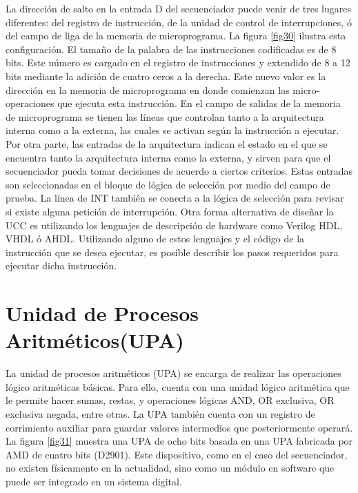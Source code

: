 \documentclass[12pt]{book}
\theoremstyle{definition}
\theoremstyle{remark}
\theoremstyle{plain}
\begin{document}
La dirección de salto en la entrada D del secuenciador puede
venir de tres lugares diferentes: del registro de instrucción, de la unidad de control de interrupciones,
ó del campo de liga de la memoria de microprograma. La figura \ref{fig30} ilustra esta configuración.
El tamaño de la palabra de las instrucciones codificadas es de 8 bits. Este número es cargado en
el registro de instrucciones y extendido de 8 a 12 bits mediante la adición de cuatro ceros a la derecha. Este nuevo valor es la dirección en la memoria de microprograma en donde comienzan las
micro-operaciones que ejecuta esta instrucción.
En el campo de salidas de la memoria de microprograma se tienen las líneas que controlan tanto a
la arquitectura interna como a la externa, las cuales se activan según la instrucción a ejecutar.
Por otra parte, las entradas de la arquitectura indican el estado en el que se encuentra tanto la
arquitectura interna como la externa, y sirven para que el secuenciador pueda tomar decisiones de
acuerdo a ciertos criterios. Estas entradas son seleccionadas en el bloque de lógica de selección por
medio del campo de prueba. La línea de INT también se conecta a la lógica de selección para revisar
si existe alguna petición de interrupción.
Otra forma alternativa de diseñar la UCC es utilizando los lenguajes de descripción de hardware
como Verilog HDL, VHDL ó AHDL. Utilizando alguno de estos lenguajes y el código de la
instrucción que se desea ejecutar, es posible describir los pasos requeridos para ejecutar dicha
instrucción.

\section{Unidad de Procesos Aritméticos(UPA)}


La unidad de procesos aritméticos (UPA) se encarga de realizar las operaciones lógico
aritméticas básicas. Para ello, cuenta con una unidad lógico aritmética que le permite hacer sumas,
restas, y operaciones lógicas AND, OR exclusiva, OR exclusiva negada, entre otras. La UPA
también cuenta con un registro de corrimiento auxiliar para guardar valores intermedios que
posteriormente operará.
La figura \ref{fig31} muestra una UPA de ocho bits basada en una UPA fabricada por AMD de cuatro
bits (D2901). Este dispositivo, como en el caso del secuenciador, no existen físicamente en la
actualidad, sino como un módulo en software que puede ser integrado en un sistema digital.
\end{document}
